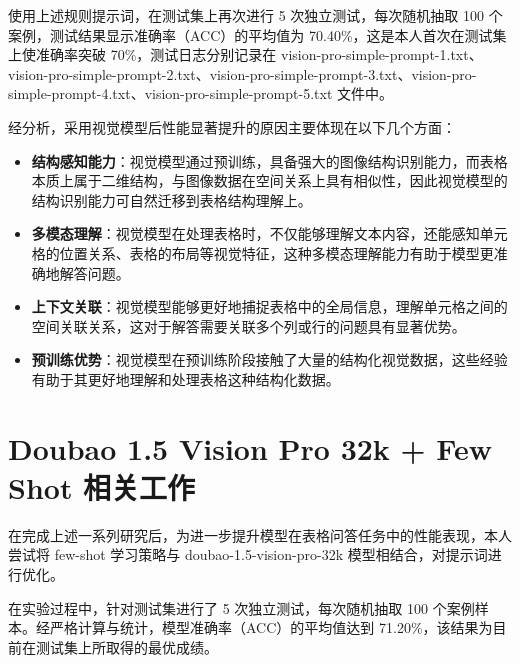 使用上述规则提示词，在测试集上再次进行 5 次独立测试，每次随机抽取 100 个案例，测试结果显示准确率（ACC）的平均值为 70.40\%，这是本人首次在测试集上使准确率突破 70\%，测试日志分别记录在 vision-pro-simple-prompt-1.txt、vision-pro-simple-prompt-2.txt、vision-pro-simple-prompt-3.txt、vision-pro-simple-prompt-4.txt、vision-pro-simple-prompt-5.txt 文件中。

经分析，采用视觉模型后性能显著提升的原因主要体现在以下几个方面：

\begin{itemize}
  \item \textbf{结构感知能力}：视觉模型通过预训练，具备强大的图像结构识别能力，而表格本质上属于二维结构，与图像数据在空间关系上具有相似性，因此视觉模型的结构识别能力可自然迁移到表格结构理解上。
  \item \textbf{多模态理解}：视觉模型在处理表格时，不仅能够理解文本内容，还能感知单元格的位置关系、表格的布局等视觉特征，这种多模态理解能力有助于模型更准确地解答问题。
  \item \textbf{上下文关联}：视觉模型能够更好地捕捉表格中的全局信息，理解单元格之间的空间关联关系，这对于解答需要关联多个列或行的问题具有显著优势。
  \item \textbf{预训练优势}：视觉模型在预训练阶段接触了大量的结构化视觉数据，这些经验有助于其更好地理解和处理表格这种结构化数据。
\end{itemize}

\section{Doubao 1.5 Vision Pro 32k + Few Shot 相关工作}
在完成上述一系列研究后，为进一步提升模型在表格问答任务中的性能表现，本人尝试将 few-shot 学习策略与 doubao-1.5-vision-pro-32k 模型相结合，对提示词进行优化。

在实验过程中，针对测试集进行了 5 次独立测试，每次随机抽取 100 个案例样本。经严格计算与统计，模型准确率（ACC）的平均值达到 71.20\%，该结果为目前在测试集上所取得的最优成绩。




